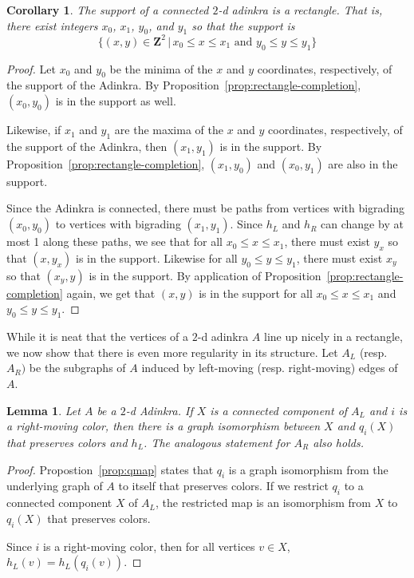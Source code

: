 \documentclass[12pt,twoside,singlespace]{article}
\numberwithin{equation}{section}
\newtheorem{lem}[equation]{Lemma}
\newtheorem{cor}[equation]{Corollary}
\theoremstyle{definition}
\newcommand{\ZZ}{\mathbf{Z}}
\begin{document}
\begin{cor}
\label{cor:rectangle}
The support of a connected $2$-d adinkra is a rectangle.  That is, there exist integers $x_0$, $x_1$, $y_0$, and $y_1$ so that the support is
\[\{(x,y)\in\ZZ^2\,|\,x_0\le x\le x_1\mbox{ and }y_0\le y\le y_1\}\]
\end{cor}
\begin{proof}
Let $x_0$ and $y_0$ be the minima of the $x$ and $y$ coordinates, respectively, of the support of the Adinkra.  By Proposition~\ref{prop:rectangle-completion}, $(x_0,y_0)$ is in the support as well.

Likewise, if $x_1$ and $y_1$ are the maxima of the $x$ and $y$ coordinates, respectively, of the support of the Adinkra, then $(x_1,y_1)$ is in the support.  By Proposition~\ref{prop:rectangle-completion}, $(x_1,y_0)$ and $(x_0,y_1)$ are also in the support.

Since the Adinkra is connected, there must be paths from vertices with bigrading $(x_0,y_0)$ to vertices with bigrading $(x_1,y_1)$.  Since $h_L$ and $h_R$ can change by at most 1 along these paths, we see that for all $x_0\le x\le x_1$, there must exist $y_x$ so that $(x,y_x)$ is in the support.  Likewise for all $y_0\le y\le y_1$, there must exist $x_y$ so that $(x_y,y)$ is in the support.  By application of Proposition~\ref{prop:rectangle-completion} again, we get that $(x,y)$ is in the support for all $x_0\le x\le x_1$ and $y_0\le y\le y_1$.
\end{proof}

While it is neat that the vertices of a $2$-d adinkra $A$ line up nicely in a rectangle, we now show that there is even more regularity in its structure. Let $A_L$ (resp. $A_R)$ be the subgraphs of $A$ induced by left-moving (resp. right-moving) edges of $A$. %

\begin{lem}
\label{lem:qiso}
Let $A$ be a $2$-d Adinkra.  If $X$ is a connected component of $A_L$ and $i$ is a right-moving color, then there is a graph isomorphism between $X$ and $q_i(X)$ that preserves colors and $h_L$.  The analogous statement for $A_R$ also holds.
\end{lem}
\begin{proof}
Propostion~\ref{prop:qmap} states that $q_i$ is a graph isomorphism from the underlying graph of $A$ to itself that preserves colors.  If we restrict  $q_i$ to a connected component $X$ of $A_L$, the restricted map is an isomorphism from $X$ to $q_i(X)$ that preserves colors.

Since $i$ is a right-moving color, then for all vertices $v\in X$, $h_L(v)=h_L(q_i(v))$.
\end{proof}
\end{document}
